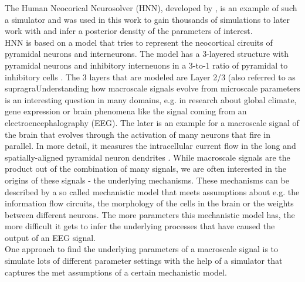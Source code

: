 \documentclass[12pt]{report}
\begin{document}
The Human Neocorical Neurosolver (HNN), developed by \cite{neymotin2020human}, is an example of such a simulator and was used in this work to gain thousands of simulations to later work with and infer a posterior density of the parameters of interest. \\
HNN is based on a model that tries to represent the neocortical circuits of pyramidal neurons and interneurons. The model has a 3-layered structure with pyramidal neurons and inhibitory interneuons in a 3-to-1 ratio of pyramidal to inhibitory cells \citep{neymotin2020human}. The 3 layers that are modeled are Layer 2/3 (also referred to as supragraUnderstanding how macroscale signals evolve from microscale parameters
is an interesting question in many domains, e.g.
in research about global
climate, gene expression or brain phenomena like the signal coming from an
electroencephalography (EEG).
The later is an example for a macroscale signal of
the brain that evolves through the activation of many neurons that fire in
parallel. In more detail, it measures the intracellular current flow in the long and
spatially-aligned pyramidal neuron dendrites \citep{neymotin2020human}.
While macroscale signals are the product out of the combination of many signals, we are often interested in the origins of these signals - the underlying mechanisms. 
These mechanisms can be described by a so called mechanistic model that meets assumptions about e.g. the information flow circuits, the morphology of the cells in the brain or the weights between different neurons. The more parameters this mechanistic model has, the more difficult it gets to infer the underlying processes that have caused the output of an EEG signal. \\
One approach to find the underlying parameters of a macroscale signal is to simulate lots of different parameter settings with the help of a simulator that captures the met assumptions of a certain mechanistic model. 
\end{document}

